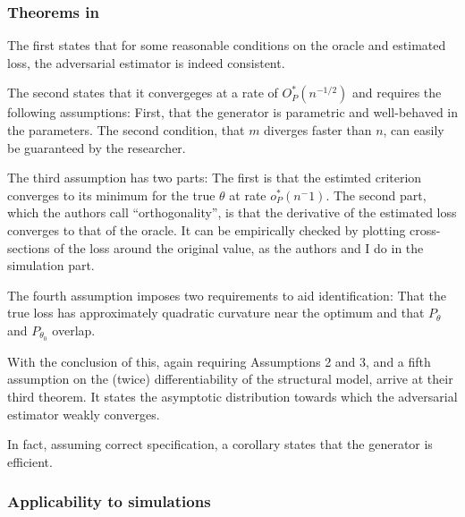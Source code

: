 \subsubsection{Theorems in \cite{kaji2023adversarial}}
\label{sec:theorems_paper}

The first states that for some reasonable conditions on the oracle and estimated loss, the adversarial estimator is indeed consistent.

The second states that it convergeges at a rate of $O^{*}_P(n^{-1/2})$ and requires the following assumptions:
First, that the generator is parametric and well-behaved in the parameters.
The second condition, that $m$ diverges faster than $n$, can easily be guaranteed by the researcher.

The third assumption has two parts: The first is that the estimted criterion converges to its minimum for the true $\theta$ at rate $o^{*}_P(n^-1)$. %
The second part, which the authors call ``orthogonality'', %
is that the derivative of the estimated loss converges to that of the oracle. %
It can be empirically checked by plotting cross-sections of the loss around the original value, as the authors and I do in the simulation part.

The fourth assumption imposes two requirements to aid identification:
That the true loss has approximately quadratic curvature near the optimum and that $P_{\theta}$ and $P_{\theta_0}$ overlap.

With the conclusion of this, again requiring Assumptions 2 and 3, and a fifth assumption on the (twice) differentiability of the structural model, 
\textcite{kaji2023adversarial} arrive at their third theorem.
It states the asymptotic distribution towards which the adversarial estimator weakly converges.

In fact, assuming correct specification, a corollary states that the generator is efficient. %


\subsubsection{Applicability to simulations}
\label{sec:theoerem_simulation}

